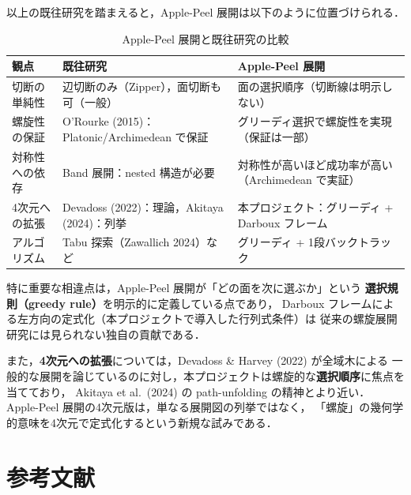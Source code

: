 \documentclass[a4paper,11pt]{article}
\begin{document}
以上の既往研究を踏まえると，Apple-Peel 展開は以下のように位置づけられる．

\begin{table}[h]
\centering
\caption{Apple-Peel 展開と既往研究の比較}
\label{tab:comparison}
\renewcommand{\arraystretch}{1.3}
\begin{tabular}{lp{5.2cm}p{5.8cm}}
\toprule
観点 & 既往研究 & Apple-Peel 展開 \\
\midrule
切断の単純性
  & 辺切断のみ（Zipper），面切断も可（一般）
  & 面の選択順序（切断線は明示しない） \\
螺旋性の保証
  & O'Rourke (2015)：Platonic/Archimedean で保証
  & グリーディ選択で螺旋性を実現（保証は一部） \\
対称性への依存
  & Band 展開：nested 構造が必要
  & 対称性が高いほど成功率が高い（Archimedean で実証） \\
4次元への拡張
  & Devadoss (2022)：理論，Akitaya (2024)：列挙
  & 本プロジェクト：グリーディ + Darboux フレーム \\
アルゴリズム
  & Tabu 探索（Zawallich 2024）など
  & グリーディ + 1段バックトラック \\
\bottomrule
\end{tabular}
\end{table}

特に重要な相違点は，Apple-Peel 展開が「どの面を次に選ぶか」という
\textbf{選択規則（greedy rule）}を明示的に定義している点であり，
Darboux フレームによる左方向の定式化（本プロジェクトで導入した行列式条件）は
従来の螺旋展開研究には見られない独自の貢献である．

また，\textbf{4次元への拡張}については，Devadoss \& Harvey (2022) が全域木による
一般的な展開を論じているのに対し，本プロジェクトは螺旋的な\textbf{選択順序}に焦点を当てており，
Akitaya et al.\ (2024) の path-unfolding の精神とより近い．
Apple-Peel 展開の4次元版は，単なる展開図の列挙ではなく，
「螺旋」の幾何学的意味を4次元で定式化するという新規な試みである．

\section*{参考文献}
\end{document}

